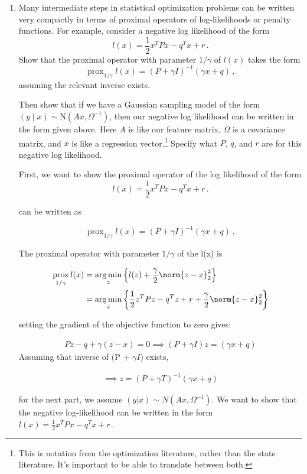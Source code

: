 \documentclass{article}
\DeclareMathOperator*{\argmin}{arg\,min}
\DeclareMathOperator*{\prox}{prox}
\newcommand{\N}{\mbox{N}}
\begin{document}
\begin{enumerate}[label=(\Alph*)]
{}

\item Many intermediate steps in statistical optimization problems can be written very compactly in terms of proximal operators of log-likelihoods or penalty functions.  For example, consider a negative log likelihood of the form
$$
l(x) = \frac{1}{2} x^{T} P x - q^{T} x + r \, .
$$
Show that the proximal operator with parameter $1/\gamma$ of $l(x)$ takes the form
$$
\prox_{1/\gamma} l(x) = (P + \gamma I)^{-1} (\gamma  x + q) \, ,
$$
assuming the relevant inverse exists. 

Then show that if we have a Gaussian sampling model of the form $(y \mid x) \sim \N(Ax, \Omega^{-1})$, then our negative log likelihood can be written in the form given above.  Here $A$ is like our feature matrix, $\Omega$ is a covariance matrix, and $x$ is like a regression vector.\footnote{This is notation from the optimization literature, rather than the stats literature.  It's important to be able to translate between both.}  Specify what $P$, $q$, and $r$ are for this negative log likelihood.

{\color{blue}
First, we want to show the proximal operator of the log likelihood of the form 
$$
l(x) = \frac{1}{2} x^{T} P x - q^{T} x + r \, .
$$

can be written as 

$$
\prox_{1/\gamma} l(x) = (P + \gamma I)^{-1} (\gamma  x + q) \, ,
$$

The proximal operator with parameter $1/\gamma$ of the l(x) is

\begin{align}
		\prox_{1 / \gamma} l(x) &= \argmin_z \left \{ l(z) + \frac{\gamma}{2} \norm{z-x}_2^2 \right \} \\
		&= \argmin_z \left \{ \frac{1}{2}z^T P z - q^T z + r + \frac{\gamma}{2} \norm{z-x}_2^2 \right \}
\end{align}

setting the gradient of the objective function to zero gives:

\begin{align}
		Pz - q + \gamma(z - x) = 0 \implies
		(P + \gamma I)z = (\gamma x + q) 
	\end{align}
Assuming that inverse of (P + $\gamma I$) exists,

\begin{align}
\implies z = (P + \gamma T)^{-1}(\gamma x + q)
\end{align}


for the next part, we assume $(y|x) \sim N(Ax, \Omega^{-1})$. We want to show that the negative log-likelihood can be written in the form $l(x) = \frac{1}{2} x^{T} P x - q^{T} x + r \ $.

}
\end{enumerate}
\end{document}
